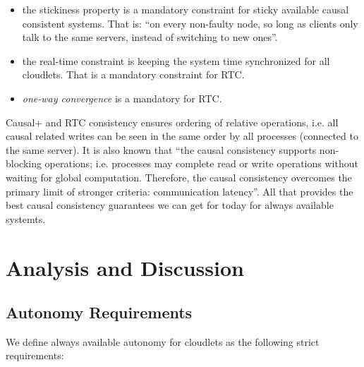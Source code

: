 \documentclass[conference]{IEEEtran}
\begin{document}
\begin{itemize}
  \item the stickiness property is a mandatory constraint for sticky available
    causal consistent systems. That is: ``on every non-faulty node, so long
    as clients only talk to the same servers, instead of switching to new
    ones''\cite{b4}.
  \item the real-time constraint is keeping the system time synchronized for
    all cloudlets. That is a mandatory constraint for RTC.
  \item \textit{one-way convergence}\cite{b2} is a mandatory for RTC.
\end{itemize}

Causal+ and RTC consistency ensures ordering of relative operations, i.e. all
causal related writes can be seen in the same order by all processes
(connected to the same server). It is also known that ``the causal consistency
supports non-blocking operations; i.e. processes may complete read or write
operations without waiting for global computation. Therefore, the causal
consistency overcomes the primary limit of stronger criteria: communication
latency''\cite{b6}. All that provides the best causal consistency guarantees we
can get for today for always available systemts.

\section{Analysis and Discussion}

\subsection{Autonomy Requirements}

We define always available autonomy for cloudlets as the following strict
requirements:
\end{document}
